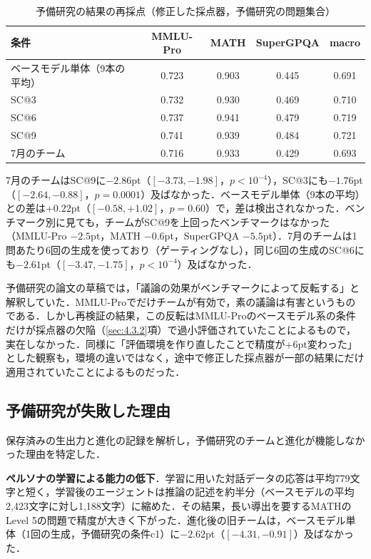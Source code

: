 \begin{table}[htbp]
\caption{予備研究の結果の再採点（修正した採点器，予備研究の問題集合）}
\label{tab:5.1}
\centering
\small
\begin{tabular}{|l|c|c|c|c|}
\hline
条件 & MMLU-Pro & MATH & SuperGPQA & macro \\
\hline
ベースモデル単体（9本の平均） & 0.723 & 0.903 & 0.445 & 0.691 \\
SC@3 & 0.732 & 0.930 & 0.469 & 0.710 \\
SC@6 & 0.737 & 0.941 & 0.479 & 0.719 \\
SC@9 & 0.741 & 0.939 & 0.484 & 0.721 \\
7月のチーム & 0.716 & 0.933 & 0.429 & 0.693 \\
\hline
\end{tabular}
\end{table}

7月のチームはSC@9に$-2.86$pt（$[-3.73, -1.98]$，$p < 10^{-4}$），SC@3にも$-1.76$pt（$[-2.64, -0.88]$，$p = 0.0001$）及ばなかった．ベースモデル単体（9本の平均）との差は$+0.22$pt（$[-0.58, +1.02]$，$p = 0.60$）で，差は検出されなかった．ベンチマーク別に見ても，チームがSC@9を上回ったベンチマークはなかった（MMLU-Pro $-2.5$pt，MATH $-0.6$pt，SuperGPQA $-5.5$pt）．7月のチームは1問あたり6回の生成を使っており（ゲーティングなし），同じ6回の生成のSC@6にも$-2.61$pt（$[-3.47, -1.75]$，$p < 10^{-4}$）及ばなかった．

予備研究の論文の草稿では，「議論の効果がベンチマークによって反転する」と解釈していた．MMLU-Proでだけチームが有効で，素の議論は有害というものである．しかし再検証の結果，この反転はMMLU-Proのベースモデル系の条件だけが採点器の欠陥（\ref{sec:4.3.2}項）で過小評価されていたことによるもので，実在しなかった．同様に「評価環境を作り直したことで精度が+6pt変わった」とした観察も，環境の違いではなく，途中で修正した採点器が一部の結果にだけ適用されていたことによるものだった．

\subsection{予備研究が失敗した理由}
\label{sec:5.1.3}

保存済みの生出力と進化の記録を解析し，予備研究のチームと進化が機能しなかった理由を特定した．

\textbf{ペルソナの学習による能力の低下}．学習に用いた対話データの応答は平均779文字と短く，学習後のエージェントは推論の記述を約半分（ベースモデルの平均2,423文字に対し1,188文字）に縮めた．その結果，長い導出を要するMATHのLevel 5の問題で精度が大きく下がった．進化後の旧チームは，ベースモデル単体（1回の生成，予備研究の条件c1）に$-2.62$pt（$[-4.31, -0.91]$）及ばなかった．

